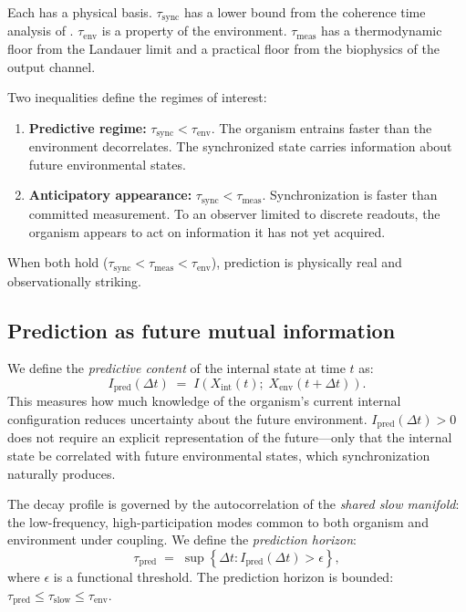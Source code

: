 \documentclass[12pt]{article}
\newcommand{\tsync}{\tau_{\mathrm{sync}}}
\newcommand{\tenv}{\tau_{\mathrm{env}}}
\newcommand{\tmeas}{\tau_{\mathrm{meas}}}
\newcommand{\tpred}{\tau_{\mathrm{pred}}}
\newcommand{\tslow}{\tau_{\mathrm{slow}}}
\begin{document}
\noindent Each has a physical basis. $\tsync$ has a lower bound from the coherence time analysis of \cite{todd2026coherence}. $\tenv$ is a property of the environment. $\tmeas$ has a thermodynamic floor from the Landauer limit \cite{todd2025demon} and a practical floor from the biophysics of the output channel.

Two inequalities define the regimes of interest:
\begin{enumerate}
\item \textbf{Predictive regime:} $\tsync < \tenv$. The organism entrains faster than the environment decorrelates. The synchronized state carries information about future environmental states.
\item \textbf{Anticipatory appearance:} $\tsync < \tmeas$. Synchronization is faster than committed measurement. To an observer limited to discrete readouts, the organism appears to act on information it has not yet acquired.
\end{enumerate}
When both hold ($\tsync < \tmeas < \tenv$), prediction is physically real and observationally striking.

\subsection{Prediction as future mutual information}
\label{sec:mutual_info}

We define the \textit{predictive content} of the internal state at time $t$ as:
\begin{equation}
\label{eq:predictive_content}
I_{\mathrm{pred}}(\Delta t) \;=\; I\!\left(X_{\mathrm{int}}(t);\; X_{\mathrm{env}}(t + \Delta t)\right).
\end{equation}
This measures how much knowledge of the organism's current internal configuration reduces uncertainty about the future environment. $I_{\mathrm{pred}}(\Delta t) > 0$ does not require an explicit representation of the future---only that the internal state be correlated with future environmental states, which synchronization naturally produces.

The decay profile is governed by the autocorrelation of the \textit{shared slow manifold}: the low-frequency, high-participation modes common to both organism and environment under coupling. We define the \textit{prediction horizon}:
\begin{equation}
\label{eq:pred_horizon}
\tpred \;=\; \sup\!\left\{\Delta t : I_{\mathrm{pred}}(\Delta t) > \epsilon\right\},
\end{equation}
where $\epsilon$ is a functional threshold. The prediction horizon is bounded: $\tpred \leq \tslow \leq \tenv$.
\end{document}
